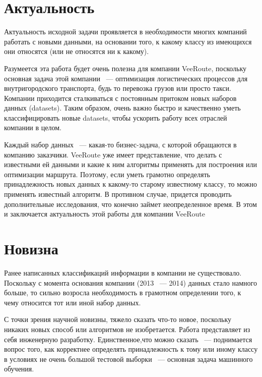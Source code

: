 \section{Актуальность}

Актуальность исходной задачи проявляется в необходимости многих компаний работать с новыми данными, на основании того, к какому классу из имеющихся они относятся (или не относятся ни к какому).

Разумеется эта работа будет очень полезна для компании VeeRoute, поскольку основная задача этой компании ~--- оптимизация логистических процессов для внутригородского транспорта, будь то перевозка грузов или просто такси.
Компании приходится сталкиваться с постоянным притоком новых наборов данных (datasets).
Таким образом, очень важно быстро и качественно уметь классифицировать новые datasets, чтобы ускорить работу всех отраслей компании в целом.

Каждый набор данных ~--- какая-то бизнес-задача, с которой обращаются в компанию заказчики. VeeRoute уже имеет представление, что делать с известными ей данными и какие к ним алгоритмы применять для построения или оптимизации маршрута. Поэтому, если уметь грамотно определять принадлежность новых данных к какому-то старому известному классу, то можно применять известный алгоритм. В противном случае, придется проводить дополнительные исследования, что конечно займет неопределенное время. В этом и заключается актуальность этой работы для компании VeeRoute



\section{Новизна}

Ранее написанных классификаций информации в компании не существовало.
Поскольку с момента основания компании (2013 ~--- 2014) данных стало намного больше, то сильно возросла необходимость в грамотном определении того, к чему относится тот или иной набор данных.

С точки зрения научной новизны, тяжело сказать что-то новое, поскольку никаких новых способ или алгоритмов не изобретается.
Работа представляет из себя инженерную разработку.
Единственное,что можно сказать ~--- поднимается вопрос того, как корректнее определять принадлежность к тому или иному классу в условиях не очень большой тестовой выборки  ~--- основная задача машинного обучения.


